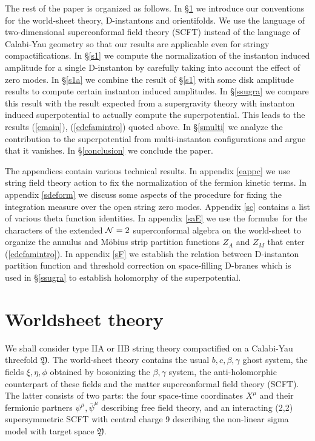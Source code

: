 \documentclass[12pt,a4paper]{article}
\newcommand{\refb}[1]{(\ref{#1})}
\newcommand{\NN}{{\cal N}}
\def\CY{\mathfrak{Y}}
\begin{document}
The rest of the paper is organized as follows. In \S\ref{sworld} we introduce our conventions
for the world-sheet theory, D-instantons and orientifolds. We use the language of
two-dimensional superconformal field theory (SCFT) instead of the language of Calabi-Yau
geometry so that our results are applicable even for stringy compactifications. In
\S\ref{s1} we compute the normalization of the instanton induced amplitude for a single
D-instanton by carefully taking into account the effect of zero modes.
In \S\ref{s1a} we combine the result of \S\ref{s1} with some disk amplitude results
to compute certain instanton induced amplitudes.
In \S\ref{ssugra} we compare this result with the result expected from a
supergravity theory with instanton induced superpotential to actually compute the superpotential.
This leads to the results \refb{emain}, \refb{edefamintro} quoted above.
In \S\ref{smulti} we analyze the contribution to the superpotential from multi-instanton
configurations and argue that it vanishes. In \S\ref{conclusion} we conclude the paper.

The appendices contain various technical
results. In appendix \ref{eappc} we use string field
theory action to fix the normalization of the fermion kinetic terms.  In appendix
\ref{sdeform} we discuss some aspects of the procedure for fixing the integration measure
over the open string zero modes.
Appendix \ref{sc}
contains a list of various theta function identities.  In appendix \ref{saE}
we use the formul\ae\ for the characters of the
extended $\NN=2$ superconformal algebra on the world-sheet
to organize the annulus and M\"{o}bius strip partition functions $Z_A$ and $Z_M$
that enter  \refb{edefamintro}. In appendix
\ref{sF} we establish the relation between D-instanton partition function and threshold
correction on space-filling D-branes which is used in \S\ref{ssugra}
to establish holomorphy of the
superpotential.

\section{Worldsheet theory} \label{sworld}

We shall consider type IIA or IIB string theory compactified on a Calabi-Yau threefold $\CY$. The
world-sheet theory contains the usual $b,c,\beta,\gamma$ ghost system, the
fields $\xi,\eta,\phi$ obtained by bosonizing the $\beta,\gamma$ system, the anti-holomorphic
counterpart of these fields and the matter superconformal field theory (SCFT). The latter consists
of two parts: the four space-time coordinates $X^\mu$ and their fermionic partners
$\psi^\mu,\bar\psi^\mu$ describing free field theory,
and an interacting (2,2) supersymmetric SCFT with central charge 9 describing
the non-linear sigma model with target space $\CY$.
\end{document}
